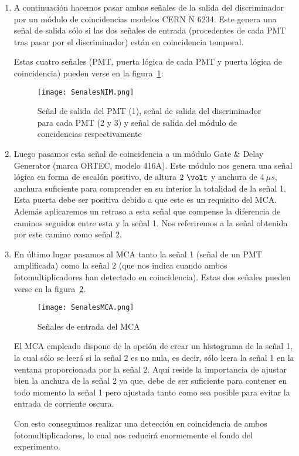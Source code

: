 \begin{enumerate}
\item{} A continuación hacemos pasar ambas señales de la salida del discriminador por un módulo de coincidencias modelos CERN N 6234. Este genera una señal de salida  sólo si las dos señales de entrada (procedentes de cada PMT tras pasar por el discriminador) están en coincidencia temporal. 

Estas cuatro señales (PMT, puerta lógica de cada PMT y puerta lógica de coincidencia) pueden verse en la figura~\ref{señales}:

\begin{figure}[hbtp]
\centering
\texttt{[image: SenalesNIM.png]}
\caption{ Señal de salida del PMT (1), señal de salida del discriminador para cada PMT (2 y 3) y señal de salida del módulo de concidencias respectivamente\label{señales}}
\end{figure}


\item {} Luego pasamos esta señal de coincidencia a un módulo Gate \& Delay Generator (marca ORTEC, modelo 416A). Este módulo nos genera una señal lógica en forma de escalón positivo, de altura $2~\volt$ y anchura de $4~\mu s$, anchura suficiente para comprender en su interior la totalidad de la señal 1. Esta puerta debe ser positiva debido a que este es un requisito del MCA. Además aplicaremos un retraso a esta señal que compense la diferencia de caminos seguidos entre esta y la señal 1. Nos referiremos a la señal obtenida por este camino como señal 2.

\item {} En último lugar pasamos al MCA tanto la señal 1 (señal de un PMT amplificada) como la señal 2 (que nos indica cuando ambos fotomultiplicadores han detectado en coincidencia). Estas dos señales pueden verse en la  figura~\ref{señales MCA}.

\begin{figure}[hbtp]
\centering
\texttt{[image: SenalesMCA.png]}
\caption{Señales de entrada del MCA\label{señales MCA}}
\end{figure}


El MCA  empleado dispone de la opción de crear un histograma de  la señal 1, la cual sólo  se leerá si la señal 2 es no nula, es decir, sólo leera la señal 1 en la ventana proporcionada por la señal 2. Aquí reside la importancia de ajustar bien la anchura de la señal 2 ya que, debe de ser suficiente para contener en todo momento la señal 1 pero ajustada tanto como sea posible para evitar la entrada de corriente oscura.

Con esto conseguimos realizar una detección en coincidencia de ambos fotomultiplicadores, lo cual nos reducirá enormemente el fondo del experimento.

\end{enumerate}



